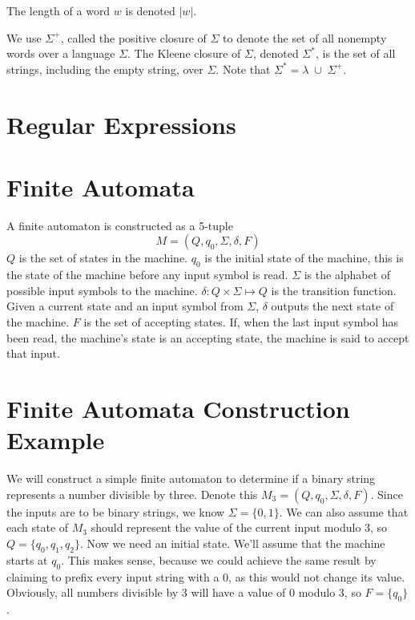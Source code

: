 \documentclass{bcthesis}
\begin{document}
		The length of a word $w$ is denoted $|w|$.\cite[pg.~1]{salomaa}


		We use $\Sigma^+$, called the positive closure of $\Sigma$ to denote the set of all nonempty words over a language $\Sigma$.
		The Kleene closure of $\Sigma$, denoted $\Sigma^*$, is the set of all strings, including the empty string, over $\Sigma$.
		Note that $\Sigma^* = \lambda \; \cup \; \Sigma^+$.

	\section{Regular Expressions} %
	\label{sec:regular_expressions}
		

	\section{Finite Automata} %
	\label{sec:finite_automata}
		A finite automaton is constructed as a 5-tuple
		\[
			M = (Q, q_0, \Sigma, \delta, F)
		\]
		$Q$ is the set of states in the machine.
		$q_0$ is the initial state of the machine, this is the state of the machine before any input symbol is read.
		$\Sigma$ is the alphabet of possible input symbols to the machine.
		$\delta: Q \times \Sigma \mapsto Q$ is the transition function.
		Given a current state and an input symbol from $\Sigma$, $\delta$ outputs the next state of the machine.
		$F$ is the set of accepting states.
		If, when the last input symbol has been read, the machine's state is an accepting state, the machine is said to accept that input.

	\section{Finite Automata Construction Example} %
	\label{sec:finite_automata_construction_example}
		We will construct a simple finite automaton to determine if a binary string represents a number divisible by three.
		Denote this $M_3 = (Q, q_0, \Sigma, \delta, F)$.
		Since the inputs are to be binary strings, we know $\Sigma = \{ 0, 1 \}$.
		We can also assume that each state of $M_3$ should represent the value of the current input modulo 3, so $Q = \{q_0, q_1, q_2\}$.
		Now we need an initial state. 
		We'll assume that the machine starts at $q_0$. 
		This makes sense, because we could achieve the same result by claiming to prefix every input string with a 0, as this would not change its value.
		Obviously, all numbers divisible by 3 will have a value of 0 modulo 3, so $F = \{q_0\}$.
\end{document}
